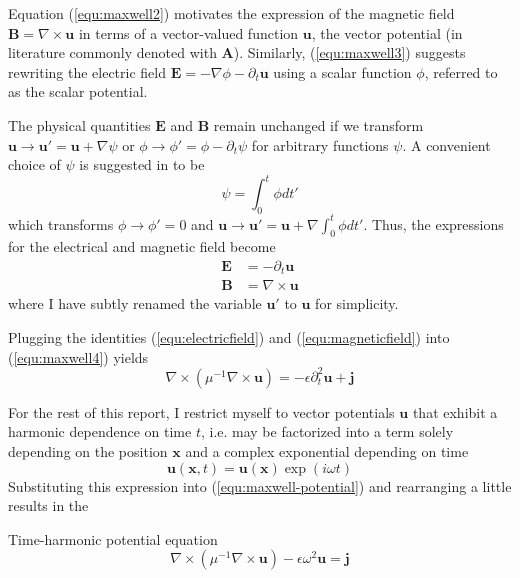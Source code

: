 \documentclass[11pt, a4paper]{article}
\begin{document}

Equation (\ref{equ:maxwell2}) motivates the expression of the magnetic field 
$\mathbf{B} = \nabla \times \mathbf{u}$ in terms of a vector-valued function
$\mathbf{u}$, the vector potential (in literature commonly denoted with
$\mathbf{A}$). Similarly, (\ref{equ:maxwell3}) suggests
rewriting the electric field $\mathbf{E} = - \nabla \phi - \partial_t \mathbf{u}$
using a scalar function $\phi$, referred to as the scalar potential.

The physical quantities $\mathbf{E}$ and $\mathbf{B}$ remain unchanged 
if we transform $\mathbf{u} \to \mathbf{u}' = \mathbf{u} + \nabla \psi$ or
$\phi \to \phi' = \phi - \partial_t \psi$ for arbitrary functions $\psi$.
A convenient choice of $\psi$ is suggested in \citep{gauge-transformation} to be
\begin{equation}
    \psi = \int_0^t \phi dt' \label{equ:gauge}
\end{equation}
which transforms $\phi \to \phi' = 0$ and $\mathbf{u} \to \mathbf{u}' = \mathbf{u}
+ \nabla \int_0^t \phi dt'$. Thus, the expressions for the electrical and
magnetic field become
\begin{align}
    \mathbf{E} &= -\partial_t \mathbf{u} \label{equ:electricfield} \\
    \mathbf{B} &= \nabla \times \mathbf{u} \label{equ:magneticfield}
\end{align}
where I have subtly renamed the variable $\mathbf{u}'$ to $\mathbf{u}$ for simplicity.

Plugging the identities (\ref{equ:electricfield}) and (\ref{equ:magneticfield})
into (\ref{equ:maxwell4}) yields 
\begin{equation}
    \nabla \times (\mu^{-1} \nabla \times \mathbf{u}) = - \epsilon \partial_t^2 \mathbf{u} + \mathbf{j} \label{equ:maxwell-potential}
\end{equation}

For the rest of this report, I restrict myself to vector potentials $\mathbf{u}$
that exhibit a harmonic dependence on time $t$, i.e. may be factorized into
a term solely depending on the position $\mathbf{x}$ and a complex exponential
depending on time
\begin{equation}
    \mathbf{u}(\mathbf{x}, t) = \mathbf{u}(\mathbf{x}) \exp(i \omega t) \label{equ:time-harmonic}
\end{equation}
Substituting this expression into (\ref{equ:maxwell-potential}) and rearranging 
a little results in the
\begin{fancybox}{Time-harmonic potential equation}
    \begin{equation}
     \nabla \times (\mu^{-1} \nabla \times \mathbf{u}) - \epsilon \omega^2 \mathbf{u} = \mathbf{j} \label{equ:maxwell-timeharmonic}
    \end{equation}
\end{fancybox}
\end{document}
